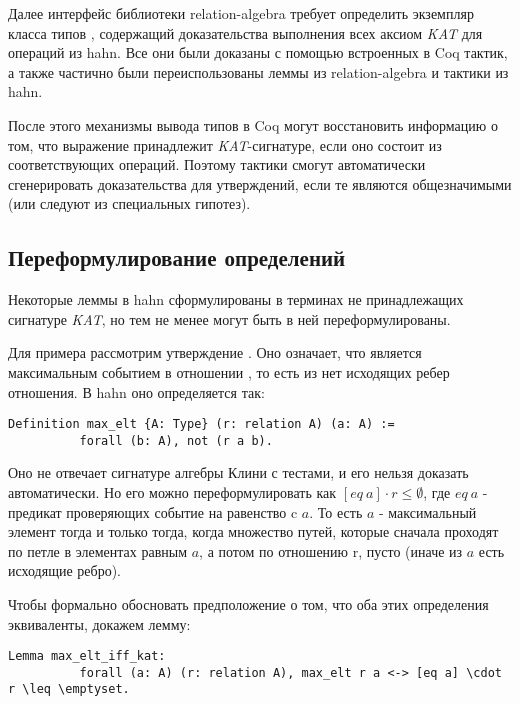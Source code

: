 \documentclass[times
              ,specification
              ,annotation
              ]{itmo-student-thesis}
\begin{document}
      Далее интерфейс библиотеки relation-algebra требует определить экземпляр класса типов
      , содержащий доказательства выполнения всех аксиом \textit{KAT} для операций из hahn.
      Все они были доказаны с помощью встроенных в Coq тактик, а также частично были переиспользованы
      леммы из relation-algebra и тактики из hahn.

      После этого механизмы вывода типов в Coq могут восстановить информацию о том, что выражение
      принадлежит \textit{KAT}-сигнатуре, если оно состоит из соответствующих операций.
      Поэтому тактики  смогут автоматически сгенерировать доказательства для
      утверждений, если те являются
      общезначимыми (или следуют из специальных гипотез).

    \subsection{Переформулирование определений}

      Некоторые леммы в hahn сформулированы в терминах не принадлежащих сигнатуре \textit{KAT}, но тем не менее
      могут быть в ней переформулированы.

      Для примера рассмотрим утверждение .
      Оно означает, что  является максимальным событием в отношении , то есть из  нет исходящих
      ребер отношения. В hahn оно определяется так:

      \begin{lstlisting}[gobble=8]
        Definition max_elt {A: Type} (r: relation A) (a: A) :=
          forall (b: A), not (r a b).
      \end{lstlisting}

      Оно не отвечает сигнатуре алгебры Клини с тестами, и его нельзя доказать автоматически.
      Но его можно переформулировать как $ [eq\ a] \cdot r \le \emptyset $, где $eq\ a$ - предикат проверяющих событие на равенство
      c $a$.
      То есть $ a $ - максимальный элемент тогда и только тогда, когда множество путей, которые сначала
      проходят по петле в элементах равным $a$, а потом по отношению r, пусто
      (иначе из $a$ есть исходящие ребро).

      Чтобы формально обосновать предположение о том, что оба этих определения эквиваленты, докажем лемму:
      \begin{lstlisting}[gobble=8]
        Lemma max_elt_iff_kat:
          forall (a: A) (r: relation A), max_elt r a <-> [eq a] \cdot r \leq \emptyset.
      \end{lstlisting}
\end{document}
